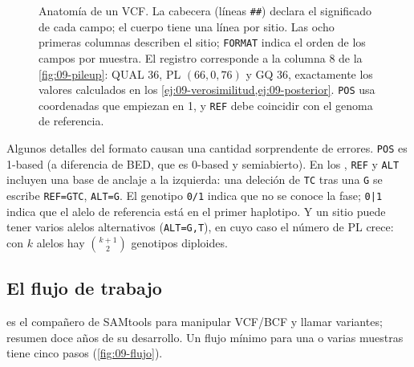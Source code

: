 \begin{figure}[t]
\caption[Anatomía de un registro VCF]{Anatomía de un VCF. La cabecera (líneas \texttt{\#\#}) declara el significado de cada campo; el cuerpo tiene una línea por sitio. Las ocho primeras columnas describen el sitio; \texttt{FORMAT} indica el orden de los campos por muestra. El registro corresponde a la columna 8 de la \cref{fig:09-pileup}: QUAL 36, PL $(66,0,76)$ y GQ 36, exactamente los valores calculados en los \cref{ej:09-verosimilitud,ej:09-posterior}. \texttt{POS} usa coordenadas que empiezan en 1, y \texttt{REF} debe coincidir con el genoma de referencia.}
\label{fig:09-vcf}
\end{figure}

Algunos detalles del formato causan una cantidad sorprendente de errores. \texttt{POS} es 1-based (a diferencia de BED, que es 0-based y semiabierto). En los , \texttt{REF} y \texttt{ALT} incluyen una base de anclaje a la izquierda: una deleción de \texttt{TC} tras una \texttt{G} se escribe \texttt{REF=GTC}, \texttt{ALT=G}. El genotipo \texttt{0/1} indica que no se conoce la fase; \texttt{0|1} indica que el alelo de referencia está en el primer haplotipo. Y un sitio puede tener varios alelos alternativos (\texttt{ALT=G,T}), en cuyo caso el número de PL crece: con $k$ alelos hay $\binom{k+1}{2}$ genotipos diploides.

\subsection{El flujo de trabajo}

 es el compañero de SAMtools para manipular VCF/BCF y llamar variantes; \textcite{c09-danecek2021} resumen doce años de su desarrollo. Un flujo mínimo para una o varias muestras tiene cinco pasos (\cref{fig:09-flujo}).

